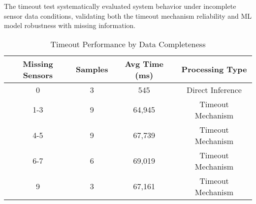 The timeout test systematically evaluated system behavior under incomplete sensor data conditions, validating both the timeout mechanism reliability and ML model robustness with missing information.

\begin{table}[htb]
\centering
\caption{Timeout Test Results by Scenario}
\label{tab:timeout-scenarios}
\end{table}

\begin{table}[htb]
\centering
\caption{Timeout Performance by Data Completeness}
\label{tab:timeout-completeness}
\begin{tabular}{|c|c|c|c|}
\hline
\textbf{Missing Sensors} & \textbf{Samples} & \textbf{Avg Time (ms)} & \textbf{Processing Type} \\
\hline
0 & 3 & 545 & Direct Inference \\
\hline
1-3 & 9 & 64,945 & Timeout Mechanism \\
\hline
4-5 & 9 & 67,739 & Timeout Mechanism \\
\hline
6-7 & 6 & 69,019 & Timeout Mechanism \\
\hline
9 & 3 & 67,161 & Timeout Mechanism \\
\hline
\end{tabular}
\end{table}

